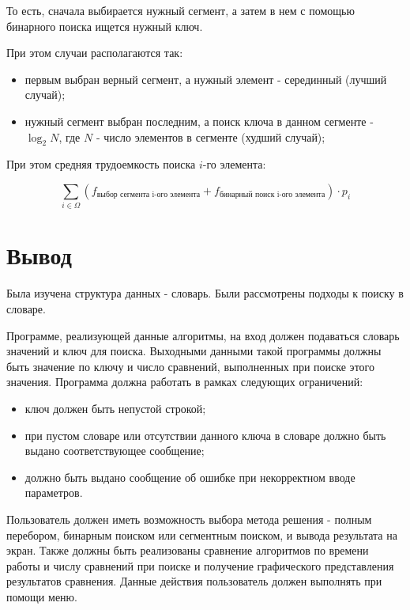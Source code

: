 То есть, сначала выбирается нужный сегмент, а затем в нем с помощью бинарного поиска ищется нужный ключ.

При этом случаи располагаются так:
\begin{itemize}
	\item первым выбран верный сегмент, а нужный элемент - серединный (лучший случай);
	\item нужный сегмент выбран последним, а поиск ключа в данном сегменте - $\log_2 N$, где $N$ - число элементов в сегменте (худший случай);
\end{itemize}

При этом средняя трудоемкость поиска $i$-го элемента:

\begin{equation}
	\sum_{i \in \Omega}{\left(f_{\text{выбор сегмента i-ого элемента}} + f_{\text{бинарный поиск i-ого элемента}}\right)} \cdot p_i
\end{equation}

\section{Вывод}

Была изучена структура данных - словарь. Были рассмотрены подходы к поиску в словаре.

Программе, реализующей данные алгоритмы, на вход должен подаваться словарь значений и ключ для поиска. Выходными данными такой программы должны быть значение по ключу и число сравнений, выполненных при поиске этого значения. Программа должна работать в рамках следующих ограничений: 

\begin{itemize}
	\item ключ должен быть непустой строкой;
	\item при пустом словаре или отсутствии данного ключа в словаре должно быть выдано соответствующее сообщение;
	\item должно быть выдано сообщение об ошибке при некорректном вводе параметров.
\end{itemize}

Пользователь должен иметь возможность выбора метода решения - полным перебором, бинарным поиском или сегментным поиском, и вывода результата на экран. Также должны быть реализованы сравнение алгоритмов по времени работы и числу сравнений при поиске и получение графического представления результатов сравнения. Данные действия пользователь должен выполнять при помощи меню.